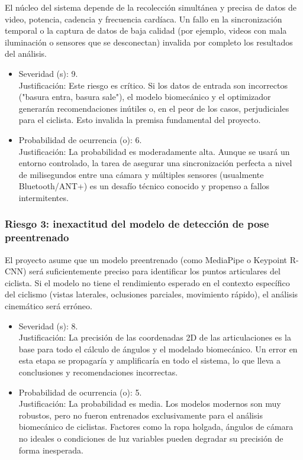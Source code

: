 \documentclass[
11pt, %
]{charter}
\begin{document}
El núcleo del sistema depende de la recolección simultánea y precisa de datos de video, potencia, cadencia y frecuencia cardíaca. Un fallo en la sincronización temporal o la captura de datos de baja calidad (por ejemplo, videos con mala iluminación o sensores que se desconectan) invalida por completo los resultados del análisis.
\begin{itemize}
  \item Severidad (s): 9.\\
  Justificación: Este riesgo es crítico. Si los datos de entrada son incorrectos ("basura entra, basura sale"), el modelo biomecánico y el optimizador generarán recomendaciones inútiles o, en el peor de los casos, perjudiciales para el ciclista. Esto invalida la premisa fundamental del proyecto.
  \item Probabilidad de ocurrencia (o): 6.\\
  Justificación: La probabilidad es moderadamente alta. Aunque se usará un entorno controlado, la tarea de asegurar una sincronización perfecta a nivel de milisegundos entre una cámara y múltiples sensores (usualmente Bluetooth/ANT+) es un desafío técnico conocido y propenso a fallos intermitentes.
\end{itemize}

\subsubsection*{Riesgo 3: inexactitud del modelo de detección de pose preentrenado}

El proyecto asume que un modelo preentrenado (como MediaPipe o Keypoint R-CNN) será suficientemente preciso para identificar los puntos articulares del ciclista. Si el modelo no tiene el rendimiento esperado en el contexto específico del ciclismo (vistas laterales, oclusiones parciales, movimiento rápido), el análisis cinemático será erróneo.
\begin{itemize}
  \item Severidad (s): 8.\\
  Justificación: La precisión de las coordenadas 2D de las articulaciones es la base para todo el cálculo de ángulos y el modelado biomecánico. Un error en esta etapa se propagaría y amplificaría en todo el sistema, lo que lleva a conclusiones y recomendaciones incorrectas.
  \item Probabilidad de ocurrencia (o): 5.\\
  Justificación: La probabilidad es media. Los modelos modernos son muy robustos, pero no fueron entrenados exclusivamente para el análisis biomecánico de ciclistas. Factores como la ropa holgada, ángulos de cámara no ideales o condiciones de luz variables pueden degradar su precisión de forma inesperada.
\end{itemize}
\end{document}
